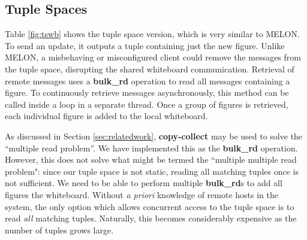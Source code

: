 \documentclass{llncs}
\begin{document}
\subsection{Tuple Spaces}

Table \ref{fig:tswb} shows the tuple space version, which is very similar to MELON. To send an update, it outputs a tuple containing just the new figure. Unlike MELON, a misbehaving or misconfigured client could remove the messages from the tuple space, disrupting the shared whiteboard communication. Retrieval of remote messages uses a \textbf{bulk\_rd} operation to read all messages containing a figure. To continuously retrieve messages asynchronously, this method can be called inside a loop in a separate thread. Once a group of figures is retrieved, each individual figure is added to the local whiteboard. 

As discussed in Section \ref{sec:relatedwork}, \textbf{copy-collect} may be used to solve the ``multiple read problem''. We have implemented this as the \textbf{bulk\_rd} operation. However, this does not solve what might be termed the ``multiple multiple read problem": since our tuple space is not static, reading all matching tuples once is not sufficient. We need to be able to perform multiple \textbf{bulk\_rd}s to add all figures the whiteboard. Without \textit{a priori} knowledge of remote hosts in the system, the only option which allows concurrent access to the tuple space is to read \textit{all} matching tuples. Naturally, this becomes considerably expensive as the number of tuples grows large.
\end{document}
